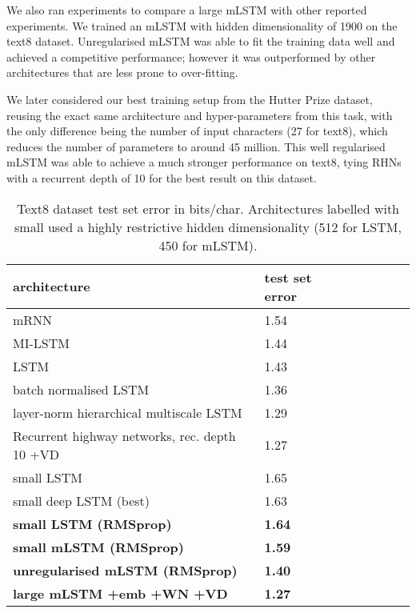 \documentclass{article}
\begin{document}
We also ran experiments to compare a large mLSTM with other reported experiments. We trained an mLSTM with hidden dimensionality of 1900 on the text8 dataset. Unregularised mLSTM was able to fit the training data well and  achieved a competitive performance; however it was outperformed by other architectures that are less prone to over-fitting. 

We later considered our best training setup from the Hutter Prize dataset, reusing the exact same architecture and hyper-parameters from this task, with the only difference being the number of input characters (27 for text8), which reduces the number of parameters to around 45 million. This well regularised mLSTM was able to achieve a much stronger performance on text8, tying RHNs with a recurrent depth of 10 for the best result on this dataset.


\begin{table}[h]
\begin{center} 
\begin{tabular}{  l  l  l  l  l  l  l } \toprule 
architecture & test set error \\ 
\midrule 
mRNN \citep{mikolov2012c} & 1.54 \\
MI-LSTM \citep{wu2016} & 1.44 \\
LSTM \citep{cooijmans2017} & 1.43 \\
batch normalised LSTM \citep{cooijmans2017} & 1.36 \\
layer-norm hierarchical multiscale LSTM \citep{chung2017}  & 1.29 \\
Recurrent highway networks, rec. depth 10 +VD \citep{zilly2017} & 1.27 \\
\midrule 
small LSTM \citep{zhang2016} & 1.65 \\
small deep LSTM (best) \citep{zhang2016}  & 1.63 \\
\textbf{small LSTM (RMSprop)} & \textbf{1.64} \\
\textbf{small mLSTM (RMSprop)}  & \textbf{1.59}  \\
\midrule 
\textbf{unregularised mLSTM (RMSprop)} & \textbf{1.40} \\
\textbf{large mLSTM +emb +WN +VD} & \textbf{1.27} \\
\bottomrule
\end{tabular} 
\end{center}
\caption{Text8 dataset test set error in bits/char. Architectures labelled with small used a highly restrictive hidden dimensionality (512 for LSTM, 450 for mLSTM).}
\label{tab:text8-res}
\end{table}
\end{document}
